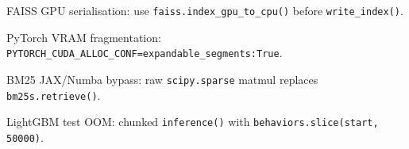\documentclass[11pt,a4paper]{article}
\begin{document}
\begin{description}[noitemsep]
  \item[§7.1] FAISS GPU serialisation: use \texttt{faiss.index\_gpu\_to\_cpu()} before \texttt{write\_index()}.
  \item[§7.2] PyTorch VRAM fragmentation: \texttt{PYTORCH\_CUDA\_ALLOC\_CONF=expandable\_segments:True}.
  \item[§7.11] BM25 JAX/Numba bypass: raw \texttt{scipy.sparse} matmul replaces \texttt{bm25s.retrieve()}.
  \item[§7.13] LightGBM test OOM: chunked \texttt{inference()} with \texttt{behaviors.slice(start, 50000)}.
\end{description}
\end{document}
